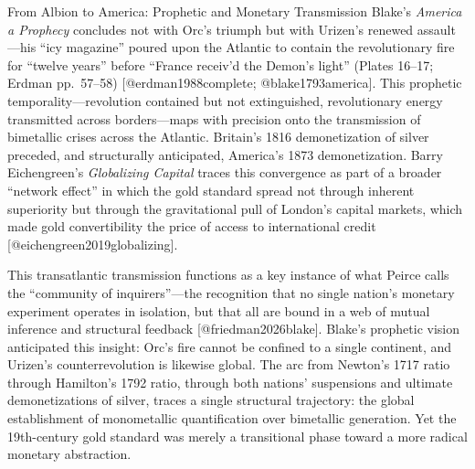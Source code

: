 \documentclass[
  ignorenonframetext,
]{beamer}
\begin{document}
\begin{frame}{From Albion to America: Prophetic and Monetary
Transmission}
\protect{}\label{from-albion-to-america-prophetic-and-monetary-transmission}
Blake's \emph{America a Prophecy} concludes not with Orc's triumph but
with Urizen's renewed assault---his ``icy magazine'' poured upon the
Atlantic to contain the revolutionary fire for ``twelve years'' before
``France receiv'd the Demon's light'' (Plates 16--17; Erdman pp.~57--58)
{[}@erdman1988complete; @blake1793america{]}. This prophetic
temporality---revolution contained but not extinguished, revolutionary
energy transmitted across borders---maps with precision onto the
transmission of bimetallic crises across the Atlantic. Britain's 1816
demonetization of silver preceded, and structurally anticipated,
America's 1873 demonetization. Barry Eichengreen's \emph{Globalizing
Capital} traces this convergence as part of a broader ``network effect''
in which the gold standard spread not through inherent superiority but
through the gravitational pull of London's capital markets, which made
gold convertibility the price of access to international credit
{[}@eichengreen2019globalizing{]}.

This transatlantic transmission functions as a key instance of what
Peirce calls the ``community of inquirers''---the recognition that no
single nation's monetary experiment operates in isolation, but that all
are bound in a web of mutual inference and structural feedback
{[}@friedman2026blake{]}. Blake's prophetic vision anticipated this
insight: Orc's fire cannot be confined to a single continent, and
Urizen's counterrevolution is likewise global. The arc from Newton's
1717 ratio through Hamilton's 1792 ratio, through both nations'
suspensions and ultimate demonetizations of silver, traces a single
structural trajectory: the global establishment of monometallic
quantification over bimetallic generation. Yet the 19th-century gold
standard was merely a transitional phase toward a more radical monetary
abstraction.
\end{frame}
\end{document}
